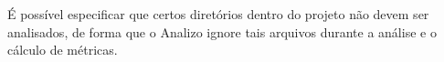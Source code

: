 \begin{itemize}
\begin{itemize}
\end{itemize}

É possível especificar que certos diretórios dentro do projeto não devem ser
analisados, de forma que o Analizo ignore tais arquivos durante a análise e o
cálculo de métricas.

%



%

%
%


\end{itemize}
